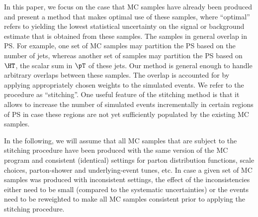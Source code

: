 In this paper, we focus on the case that MC samples have already been produced and present a method that makes optimal use of these samples,
where ``optimal'' refers to yielding the lowest statistical uncertainty on the signal or background estimate that is obtained from these samples.
The samples in general overlap in PS.
For example, one set of MC samples may partition the PS based on the number of jets, 
whereas another set of samples may partition the PS based on $\HT$, the scalar sum in $\pT$ of these jets.
Our method is general enough to handle arbitrary overlaps between these samples.
The overlap is accounted for by applying appropriately chosen weights to the simulated events.
We refer to the procedure as ``stitching''.
One useful feature of the stitching method is that it allows to increase the number of simulated events incrementally in certain regions of PS
in case these regions are not yet sufficiently populated by the existing MC samples.

In the following, we will assume that all MC samples that are subject to the stitching procedure 
have been produced with the same version of the MC program and consistent (\ie identical) settings 
for parton distribution functions, scale choices, parton-shower and underlying-event tunes, etc.
In case a given set of MC samples was produced with inconsistent settings,
the effect of the inconsistencies either need to be small (compared to \eg the systematic uncertainties) or the events need to be reweighted
to make all MC samples consistent prior to applying the stitching procedure.

